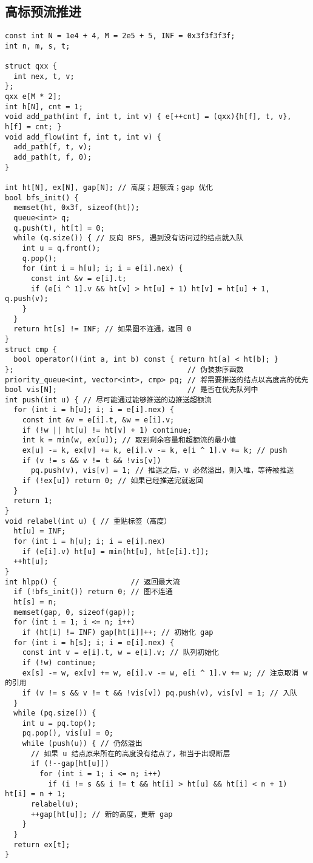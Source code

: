 \subsection{高标预流推进}
\begin{lstlisting}
const int N = 1e4 + 4, M = 2e5 + 5, INF = 0x3f3f3f3f;
int n, m, s, t;

struct qxx {
  int nex, t, v;
};
qxx e[M * 2];
int h[N], cnt = 1;
void add_path(int f, int t, int v) { e[++cnt] = (qxx){h[f], t, v}, h[f] = cnt; }
void add_flow(int f, int t, int v) {
  add_path(f, t, v);
  add_path(t, f, 0);
}

int ht[N], ex[N], gap[N]; // 高度；超额流；gap 优化
bool bfs_init() {
  memset(ht, 0x3f, sizeof(ht));
  queue<int> q;
  q.push(t), ht[t] = 0;
  while (q.size()) { // 反向 BFS, 遇到没有访问过的结点就入队
    int u = q.front();
    q.pop();
    for (int i = h[u]; i; i = e[i].nex) {
      const int &v = e[i].t;
      if (e[i ^ 1].v && ht[v] > ht[u] + 1) ht[v] = ht[u] + 1, q.push(v);
    }
  }
  return ht[s] != INF; // 如果图不连通，返回 0
}
struct cmp {
  bool operator()(int a, int b) const { return ht[a] < ht[b]; }
};                                        // 伪装排序函数
priority_queue<int, vector<int>, cmp> pq; // 将需要推送的结点以高度高的优先
bool vis[N];                              // 是否在优先队列中
int push(int u) { // 尽可能通过能够推送的边推送超额流
  for (int i = h[u]; i; i = e[i].nex) {
    const int &v = e[i].t, &w = e[i].v;
    if (!w || ht[u] != ht[v] + 1) continue;
    int k = min(w, ex[u]); // 取到剩余容量和超额流的最小值
    ex[u] -= k, ex[v] += k, e[i].v -= k, e[i ^ 1].v += k; // push
    if (v != s && v != t && !vis[v])
      pq.push(v), vis[v] = 1; // 推送之后，v 必然溢出，则入堆，等待被推送
    if (!ex[u]) return 0; // 如果已经推送完就返回
  }
  return 1;
}
void relabel(int u) { // 重贴标签（高度）
  ht[u] = INF;
  for (int i = h[u]; i; i = e[i].nex)
    if (e[i].v) ht[u] = min(ht[u], ht[e[i].t]);
  ++ht[u];
}
int hlpp() {                 // 返回最大流
  if (!bfs_init()) return 0; // 图不连通
  ht[s] = n;
  memset(gap, 0, sizeof(gap));
  for (int i = 1; i <= n; i++)
    if (ht[i] != INF) gap[ht[i]]++; // 初始化 gap
  for (int i = h[s]; i; i = e[i].nex) {
    const int v = e[i].t, w = e[i].v; // 队列初始化
    if (!w) continue;
    ex[s] -= w, ex[v] += w, e[i].v -= w, e[i ^ 1].v += w; // 注意取消 w 的引用
    if (v != s && v != t && !vis[v]) pq.push(v), vis[v] = 1; // 入队
  }
  while (pq.size()) {
    int u = pq.top();
    pq.pop(), vis[u] = 0;
    while (push(u)) { // 仍然溢出
      // 如果 u 结点原来所在的高度没有结点了，相当于出现断层
      if (!--gap[ht[u]])
        for (int i = 1; i <= n; i++)
          if (i != s && i != t && ht[i] > ht[u] && ht[i] < n + 1) ht[i] = n + 1;
      relabel(u);
      ++gap[ht[u]]; // 新的高度，更新 gap
    }
  }
  return ex[t];
}
\end{lstlisting}
